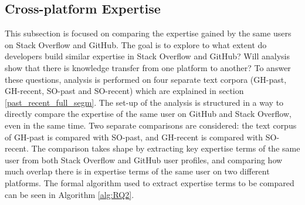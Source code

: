     \subsection{Cross-platform Expertise\label{RQ2_task}}
    
        This subsection is focused on comparing the expertise gained by the same users on Stack Overflow and GitHub. The goal is to explore to what extent do developers build similar expertise in Stack Overflow and GitHub? Will analysis show that there is knowledge transfer from one platform to another? To answer these questions, analysis is performed on four separate text corpora (GH-past, GH-recent, SO-past and SO-recent) which are explained in section \ref{past_recent_full_segm}. The set-up of the analysis is structured in a way to directly compare the expertise of the same user on GitHub and Stack Overflow, even in the same time. Two separate comparisons are considered: the text corpus of GH-past is compared with SO-past, and GH-recent is compared with SO-recent. The comparison takes shape by extracting key expertise terms of the same user from both Stack Overflow and GitHub user profiles, and comparing how much overlap there is in expertise terms of the same user on two different platforms. The formal algorithm used to extract expertise terms to be compared can be seen in Algorithm \ref{alg:RQ2}.
        
